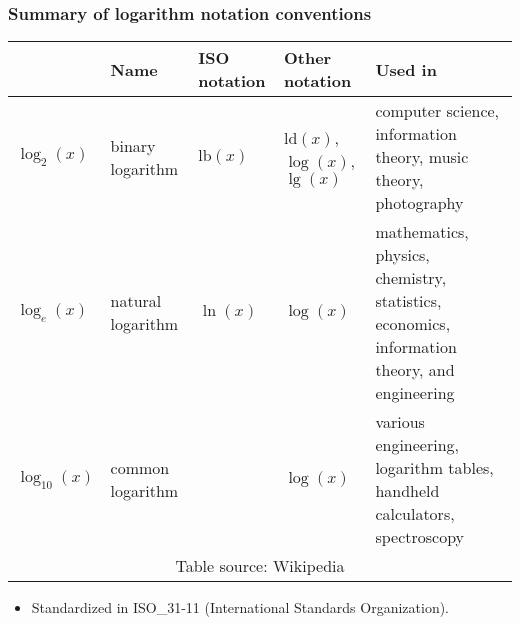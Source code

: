 \begin{frame}
\frametitle{Summary of logarithm notation conventions}
\small 
\begin{tabular}{|@{}m{1.1cm}|@{}|m{1.5cm}@{}|m{1cm}@{}|m{2cm}@{}|m{5cm}|}\hline
& Name& ISO notation& Other notation& Used in\\\hline
$\log_2(x)$&binary logarithm& $\text{lb}(x)$&$\text{ld}(x)$, $\log(x)$, $\lg(x)$& computer science, information theory, music theory, photography\\\hline
$\log_e(x)$& natural logarithm& $\ln (x)$& $\log(x)$&
mathematics, physics, chemistry,
statistics, economics, information theory, and engineering
\\\hline
$\log_{10}(x)$&common logarithm&& $\log(x)$&various engineering, logarithm tables, handheld calculators, spectroscopy\\\hline
\multicolumn{5}{c}{Table source: Wikipedia}
\end{tabular}
\begin{itemize}
\item Standardized in ISO\_31-11 (International Standards Organization).
\end{itemize}
\end{frame}


